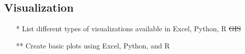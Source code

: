 \documentclass[12pt]{article}%
\begin{document}
\subsection*{Visualization}
\begin{itemize}
 \setlength{\itemsep}{1pt}%
    \setlength{\parskip}{1pt}
\item[*] List different types of visualizations available in Excel, Python, {\sf R} \st{GIS}
\item[**] Create basic plots using Excel, Python, and {\sf R}
\end{itemize}
\end{document}
